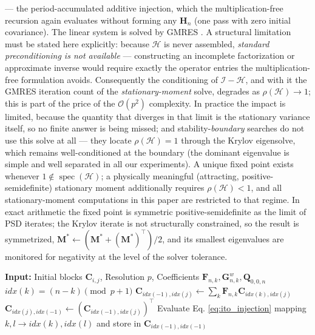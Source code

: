 \documentclass[preprint,12pt]{elsarticle}
\begin{document}
--- the period-accumulated additive injection, which the multiplication-free recursion again evaluates without forming any $\mathbf{H}_n$ (one pass with zero initial covariance). The linear system is solved by GMRES \cite{Saad1986}. A structural limitation must be stated here explicitly: because $\mathcal{H}$ is never assembled, \emph{standard preconditioning is not available} --- constructing an incomplete factorization or approximate inverse would require exactly the operator entries the multiplication-free formulation avoids. Consequently the conditioning of $\mathcal{I}-\mathcal{H}$, and with it the GMRES iteration count of the \emph{stationary-moment} solve, degrades as $\rho(\mathcal{H}) \to 1$; this is part of the price of the $\mathcal{O}(p^2)$ complexity. In practice the impact is limited, because the quantity that diverges in that limit is the stationary variance itself, so no finite answer is being missed; and stability-\emph{boundary} searches do not use this solve at all --- they locate $\rho(\mathcal{H}) = 1$ through the Krylov eigensolve, which remains well-conditioned at the boundary (the dominant eigenvalue is simple and well separated in all our experiments). A unique fixed point exists whenever $1 \notin \operatorname{spec}(\mathcal{H})$; a physically meaningful (attracting, positive-semidefinite) stationary moment additionally requires $\rho(\mathcal{H}) < 1$, and all stationary-moment computations in this paper are restricted to that regime. In exact arithmetic the fixed point is symmetric positive-semidefinite as the limit of PSD iterates; the Krylov iterate is not structurally constrained, so the result is symmetrized, $\mathbf{M}^* \leftarrow (\mathbf{M}^* + (\mathbf{M}^*)^\top)/2$, and its smallest eigenvalues are monitored for negativity at the level of the solver tolerance.

\begin{algorithm}
\caption{MF-SSDM Circular Buffer Propagation}
\label{alg:mfsd_detailed}
\begin{algorithmic}[1]
\STATE \textbf{Input:} Initial blocks $\mathbf{C}_{i,j}$, Resolution $p$, Coefficients $\mathbf{F}_{n,k}, \mathbf{G}_{n,k}^w, \mathbf{Q}_{0,0,n}$
    \STATE $idx(k) = (n - k) \pmod{p+1}$
        \STATE $\mathbf{C}_{idx(-1), idx(j)} \leftarrow \sum_{k} \mathbf{F}_{n,k} \mathbf{C}_{idx(k), idx(j)}$
        \STATE $\mathbf{C}_{idx(j), idx(-1)} \leftarrow (\mathbf{C}_{idx(-1), idx(j)})^\top$
    \ENDFOR
    \STATE Evaluate Eq. \eqref{eq:ito_injection} mapping $k, l \to idx(k), idx(l)$ and store in $\mathbf{C}_{idx(-1), idx(-1)}$
\ENDFOR
\end{algorithmic}
\end{algorithm}
\end{document}
